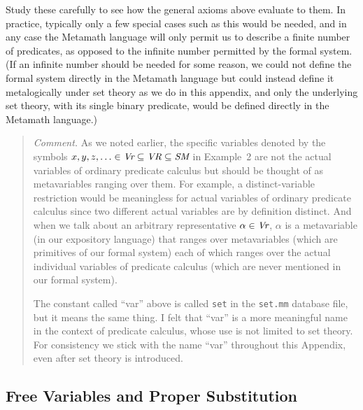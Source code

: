 Study these carefully to see how the general axioms above evaluate to
them.  In practice, typically only a few special cases such as this would be
needed, and in any case the Metamath language will only permit us to describe
a finite number of predicates, as opposed to the infinite number permitted by
the formal system.  (If an infinite number should be needed for some reason,
we could not define the formal system directly in the Metamath language but
could instead define it metalogically under set theory as we
do in this appendix, and only the underlying set theory, with its single
binary predicate, would be defined directly in the Metamath language.)


{\footnotesize\begin{quotation}
{\em Comment.}  As we noted earlier, the specific variables denoted by the
symbols $x,y,z,\ldots\in \mbox{\em Vr}\subseteq \mbox{\em VR}\subseteq
\mbox{\em SM}$ in Example~2 are not the actual variables of ordinary predicate
calculus but should be thought of as metavariables ranging over them.  For
example, a distinct-variable restriction would be meaningless for actual
variables of ordinary predicate calculus since two different actual variables
are by definition distinct.  And when we talk about an arbitrary
representative $\alpha\in \mbox{\em Vr}$, $\alpha$ is a metavariable (in our
expository language) that ranges over metavariables (which are primitives of
our formal system) each of which ranges over the actual individual variables
of predicate calculus (which are never mentioned in our formal system).

The constant called ``var'' above is called \texttt{set} in the
\texttt{set.mm} database file, but it means the same thing.  I felt
that ``var'' is a more meaningful name in the context of predicate
calculus, whose use is not limited to set theory.  For consistency we
stick with the name ``var'' throughout this Appendix, even after set
theory is introduced.
\end{quotation}}

\subsection{Free Variables and Proper Substitution}

